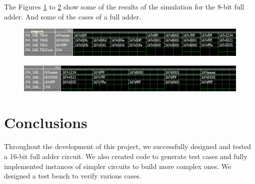 \documentclass[conference]{IEEEtran}
\begin{document}
	The Figures \ref{fig:fa16bsim1} to \ref{fig:fa16bsim2} show some of the results of the simulation for the 8-bit full adder. And some of the cases of a full adder.
	
	\begin{figure}[H]
		\centering
		\includegraphics[width=0.9\columnwidth]{FA_16B_sim1}
		\caption{}
		\label{fig:fa16bsim1}
	\end{figure}
	
	\begin{figure}[H]
		\centering
		\includegraphics[width=0.9\columnwidth]{FA_16B_sim2}
		\caption{}
		\label{fig:fa16bsim2}
	\end{figure}
	
	
	
	
	
	
	
	\section{Conclusions}
	Throughout the development of this project, we successfully designed and tested a 16-bit full adder circuit. We also created code to generate test cases and fully implemented instances of simpler circuits to build more complex ones. We designed a test bench to verify various cases.
	
	
	
	
	
	
	
	
	
\end{document}
